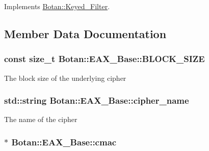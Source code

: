 Implements \hyperlink{classBotan_1_1Keyed__Filter_a9eaf5d9480445b85ffea8eb5474e2eb1}{Botan\-::\-Keyed\-\_\-\-Filter}.



\subsection{Member Data Documentation}
\hypertarget{classBotan_1_1EAX__Base_a521d9a389089f56e77c02e55f46ad66a}{
\subsubsection[{B\-L\-O\-C\-K\-\_\-\-S\-I\-Z\-E}]{\setlength{\rightskip}{0pt plus 5cm}const size\-\_\-t Botan\-::\-E\-A\-X\-\_\-\-Base\-::\-B\-L\-O\-C\-K\-\_\-\-S\-I\-Z\-E\hspace{0.3cm}{\ttfamily [protected]}}}\label{classBotan_1_1EAX__Base_a521d9a389089f56e77c02e55f46ad66a}
The block size of the underlying cipher \hypertarget{classBotan_1_1EAX__Base_a5b8212657abf64e8d8d942699bd09159}{
\subsubsection[{cipher\-\_\-name}]{\setlength{\rightskip}{0pt plus 5cm}std\-::string Botan\-::\-E\-A\-X\-\_\-\-Base\-::cipher\-\_\-name\hspace{0.3cm}{\ttfamily [protected]}}}\label{classBotan_1_1EAX__Base_a5b8212657abf64e8d8d942699bd09159}
The name of the cipher \hypertarget{classBotan_1_1EAX__Base_a806a71dabe3226d0241423fc45ea67e0}{
\subsubsection[{cmac}]{$\ast$ Botan\-::\-E\-A\-X\-\_\-\-Base\-::cmac\hspace{0.3cm}{\ttfamily [protected]}}}\label{classBotan_1_1EAX__Base_a806a71dabe3226d0241423fc45ea67e0}
